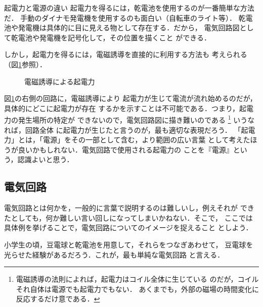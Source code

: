     \begin{memo}{起電力と電源の違い}
        起電力を得るには，乾電池を使用するのが一番簡単な方法だ．
        手動のダイナモ発電機を使用するのも面白い（自転車のライト等）．
        乾電池や発電機は具体的に目に見える物として存在する．だから，
        電気回路図として乾電池や発電機を記号化して，その位置を描くこと
        ができる．

        しかし，起電力を得るには，電磁誘導を直接的に利用する方法も
        考えられる（図\ref{fig:kidenryoku_Dengen01}参照）．
            \begin{figure}[hbt]
                \begin{center}
                    \caption{電磁誘導による起電力}
                    \label{fig:kidenryoku_Dengen01}
                \end{center}
            \end{figure}

        図\ref{fig:kidenryoku_Dengen01}の右側の回路に，電磁誘導により
        起電力が生じて電流が流れ始めるのだが，具体的にどこに起電力が存在
        するかを示すことは不可能である．つまり，起電力の発生場所の特定が
        できないので，電気回路図に描き難いのである
            \footnote{
                電磁誘導の法則によれば，起電力はコイル全体に生じている
                のだが，コイルそれ自体は電源でも起電力でもない．
                あくまでも，外部の磁場の時間変化に反応するだけ意である．
            }
        いうなれば，回路全体
        に起電力が生じたと言うのが，最も適切な表現だろう．
        「起電力」とは，「電源」をその一部として含む，より範囲の広い言葉
        として考えたほうが良いかもしれない．電気回路で使用される起電力の
        ことを『電源』という，認識よいと思う．
    \end{memo}

    \subsection{電気回路}
        電気回路とは何かを，一般的に言葉で説明するのは難しいし，例えそれが
        できたとしても，何か難しい言い回しになってしまいかねない．そこで，
        ここでは具体例を挙げることで，電気回路についてのイメージを捉えること
        としよう．

        小学生の頃，豆電球と乾電池を用意して，それらをつなぎあわせて，
        豆電球を光らせた経験があるだろう．これが，最も単純な電気回路
        と言える．

